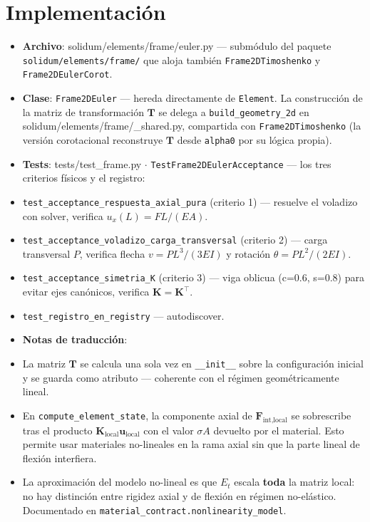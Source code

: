 \documentclass[11pt,letterpaper,oneside]{report}
\begin{document}
\section{Implementación}

\begin{itemize}
  \item \textbf{Archivo}: solidum/elements/frame/euler.py --- submódulo del paquete \texttt{solidum/elements/frame/} que aloja también \texttt{Frame2DTimoshenko} y \texttt{Frame2DEulerCorot}.
  \item \textbf{Clase}: \texttt{Frame2DEuler} --- hereda directamente de \texttt{Element}. La construcción de la matriz de transformación $\mathbf T$ se delega a \texttt{build\_geometry\_2d} en solidum/elements/frame/\_shared.py, compartida con \texttt{Frame2DTimoshenko} (la versión corotacional reconstruye $\mathbf T$ desde \texttt{alpha0} por su lógica propia).
  \item \textbf{Tests}: tests/test\_frame.py \ensuremath{\cdot} \texttt{TestFrame2DEulerAcceptance} --- los tres criterios físicos y el registro:
  \item \texttt{test\_acceptance\_respuesta\_axial\_pura} (criterio 1) --- resuelve el voladizo con solver, verifica $u_x(L) = FL/(EA)$.
  \item \texttt{test\_acceptance\_voladizo\_carga\_transversal} (criterio 2) --- carga transversal $P$, verifica flecha $v = PL^3/(3EI)$ y rotación $\theta = PL^2/(2EI)$.
  \item \texttt{test\_acceptance\_simetria\_K} (criterio 3) --- viga oblicua (c=0.6, s=0.8) para evitar ejes canónicos, verifica $\mathbf K = \mathbf K^\top$.
  \item \texttt{test\_registro\_en\_registry} --- autodiscover.
  \item \textbf{Notas de traducción}:
  \item La matriz $\mathbf T$ se calcula una sola vez en \texttt{\_\_init\_\_} sobre la configuración inicial y se guarda como atributo --- coherente con el régimen geométricamente lineal.
  \item En \texttt{compute\_element\_state}, la componente axial de $\mathbf F_{\text{int,local}}$ se sobrescribe tras el producto $\mathbf K_{\text{local}}\mathbf u_{\text{local}}$ con el valor $\sigma A$ devuelto por el material. Esto permite usar materiales no-lineales en la rama axial sin que la parte lineal de flexión interfiera.
  \item La aproximación del modelo no-lineal es que $E_t$ escala \textbf{toda} la matriz local: no hay distinción entre rigidez axial y de flexión en régimen no-elástico. Documentado en \texttt{material\_contract.nonlinearity\_model}.
\end{itemize}
\end{document}
